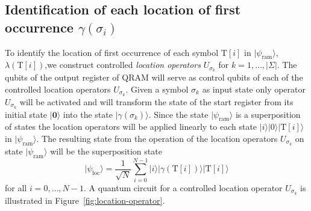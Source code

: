 \subsection{Identification of each location of first occurrence $\gamma(\sigma_i)$}
To identify the location of first occurrence of each symbol $\mathrm{T}[i]$ in $\vert \psi_{\mathrm{ram}} \rangle$, $\lambda(\mathrm{T}[i])$,we construct controlled \textit{location operators} $U_{\sigma_k}$ for $k=1,\ldots,\vert \Sigma \vert$. The qubits of the output register of QRAM will serve as control qubits of each of the controlled location operators $U_{\sigma_k}$. Given a symbol $\sigma_k$ as input state only operator $U_{\sigma_k}$ will be activated and will transform the state of the start register from its initial state $\vert \mathbf{0} \rangle$ into the state $\vert \gamma(\sigma_k) \rangle$. Since the state $\vert \psi_{\mathrm{ram}} \rangle$ is a superposition of states the location operators will be applied linearly to each state $\vert i \rangle\vert 0 \rangle\vert \mathrm{T}[i] \rangle$ in $\vert \psi_{\mathrm{ram}} \rangle$. The resulting state from the operation of the location operators $U_{\sigma_k}$ on state $\vert \psi_{\mathrm{ram}} \rangle$ will be the superposition state
\[
	\vert \psi_{\mathrm{loc}} \rangle = \frac{1}{\sqrt{N}} \sum_{i=0}^{N-1} \vert i \rangle\vert \gamma(\mathrm{T}[i]) \rangle \vert \mathrm{T}[i] \rangle
\]
for all $i=0,\ldots,N-1$. A quantum circuit for a controlled location operator $U_{\sigma_k}$ is illustrated in Figure~\ref{fig:location-operator}.
